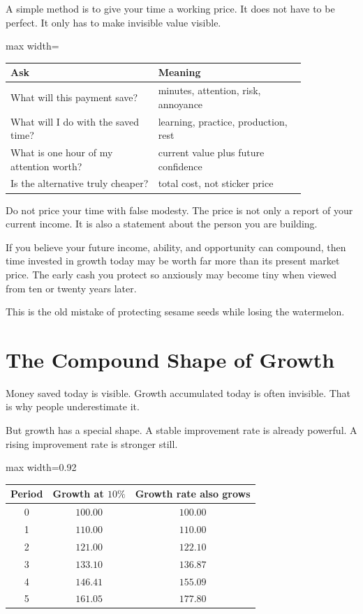 A simple method is to give your time a working price. It does not have to be perfect. It only has to make invisible value visible.

\begin{center}
\begin{adjustbox}{max width=\linewidth}
\begin{tabular}{p{0.42\linewidth}p{0.42\linewidth}}
\hline
Ask & Meaning \\
\hline
What will this payment save? & minutes, attention, risk, annoyance \\
What will I do with the saved time? & learning, practice, production, rest \\
What is one hour of my attention worth? & current value plus future confidence \\
Is the alternative truly cheaper? & total cost, not sticker price \\
\hline
\end{tabular}
\end{adjustbox}
\end{center}

Do not price your time with false modesty. The price is not only a report of your current income. It is also a statement about the person you are building.

If you believe your future income, ability, and opportunity can compound, then time invested in growth today may be worth far more than its present market price. The early cash you protect so anxiously may become tiny when viewed from ten or twenty years later.

This is the old mistake of protecting sesame seeds while losing the watermelon.

\section*{The Compound Shape of Growth}

Money saved today is visible. Growth accumulated today is often invisible. That is why people underestimate it.

But growth has a special shape. A stable improvement rate is already powerful. A rising improvement rate is stronger still.

\begin{center}
\begin{adjustbox}{max width=0.92\linewidth}
\begin{tabular}{ccc}
\hline
Period & Growth at \(10\%\) & Growth rate also grows \\
\hline
0 & \(100.00\) & \(100.00\) \\
1 & \(110.00\) & \(110.00\) \\
2 & \(121.00\) & \(122.10\) \\
3 & \(133.10\) & \(136.87\) \\
4 & \(146.41\) & \(155.09\) \\
5 & \(161.05\) & \(177.80\) \\
\hline
\end{tabular}
\end{adjustbox}
\end{center}


